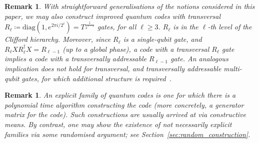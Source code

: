 \documentclass{article}
\newcounter{main}[section]
\newtheorem{remark}[main]{Remark}
\begin{document}
\begin{remark}\label{rmk:addressability}
    With straightforward generalisations of the notions considered in this paper, we may also construct improved quantum codes with transversal $R_\ell \coloneq \text{diag}(1,e^{2\pi i/2^\ell}) = T^{\frac{1}{2^{\ell-3}}}$ gates, for all $\ell \geq 3$. $R_\ell$ is in the $\ell$-th level of the Clifford hierarchy. Moreover, since $R_\ell$ is a single-qubit gate, and $R_\ell X R_\ell^\dagger X = R_{\ell-1}$ (up to a global phase), a code with a transversal $R_\ell$ gate implies a code with a transversally addressable $R_{\ell-1}$ gate. An analogous implication does not hold for transversal, and transversally addressable multi-qubit gates, for which additional structure is required~\cite{he2025quantum,he2025asymptotically}.
\end{remark}
\begin{remark}\label{rmk:explicitness}
    An explicit family of quantum codes is one for which there is a polynomial time algorithm constructing the code (more concretely, a generator matrix for the code). Such constructions are usually arrived at via constructive means. By contrast, one may show the existence of not necessarily explicit families via some randomised argument; see Section~\ref{sec:random_construction}.
\end{remark}
\end{document}
